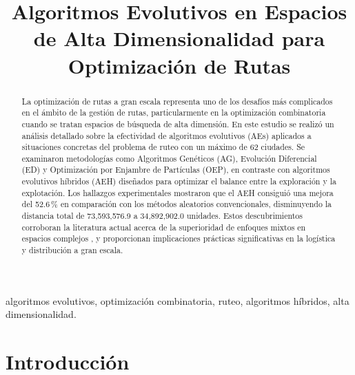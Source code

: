 \documentclass[conference]{IEEEtran}
\begin{document}
\title{Algoritmos Evolutivos en Espacios de Alta Dimensionalidad para Optimización de Rutas}

\author{
}

\maketitle

\begin{abstract}
La optimización de rutas a gran escala representa uno de los desafíos más complicados en el ámbito de la gestión de rutas, particularmente en la optimización combinatoria cuando se tratan espacios de búsqueda de alta dimensión.
En este estudio se realizó un análisis detallado sobre la efectividad de algoritmos evolutivos (AEs) aplicados a situaciones concretas del problema de ruteo con un máximo de 62 ciudades. Se examinaron metodologías como Algoritmos Genéticos (AG), Evolución Diferencial (ED) y Optimización por Enjambre de Partículas (OEP), en contraste con algoritmos evolutivos híbridos (AEH) diseñados para optimizar el balance entre la exploración y la explotación.
Los hallazgos experimentales mostraron que el AEH consiguió una mejora del 52.6\,\% en comparación con los métodos aleatorios convencionales, disminuyendo la distancia total de 73,593,576.9 a 34,892,902.0 unidades. Estos descubrimientos corroboran la literatura actual acerca de la superioridad de enfoques mixtos en espacios complejos \cite{talbi2002, sorensen2013}, y proporcionan implicaciones prácticas significativas en la logística y distribución a gran escala.
\end{abstract}

\begin{IEEEkeywords}
algoritmos evolutivos, optimización combinatoria, ruteo, algoritmos híbridos, alta dimensionalidad.
\end{IEEEkeywords}


\section{Introducción}
\end{document}
